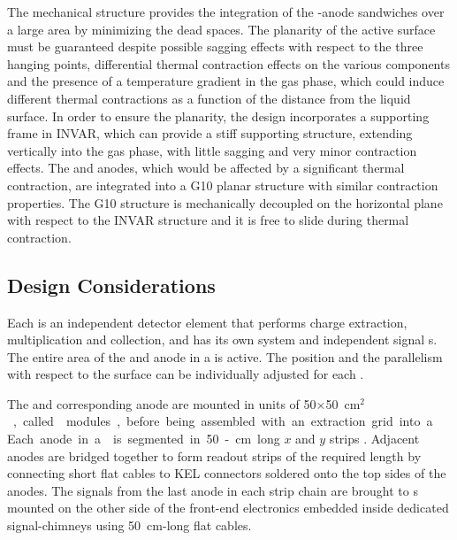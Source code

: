 The  mechanical structure provides the integration of the -anode sandwiches over a large area by minimizing the dead spaces. The planarity of the active surface must be guaranteed despite possible sagging effects with respect to the three hanging points, differential thermal contraction effects on the various  components and the presence of a temperature gradient in the gas phase, which could induce different thermal contractions as a function of the distance from the liquid surface. In order to %
ensure the planarity, the design %
incorporates a supporting frame in INVAR, which %
can provide a stiff supporting structure, extending vertically into the gas phase, with little sagging and %
very minor contraction effects. The  and anodes, which would be affected by a significant thermal contraction, are integrated into a G10 planar structure with similar contraction %
properties. The G10 structure is mechanically decoupled on the horizontal plane with respect to the INVAR structure  and it is free to slide during thermal contraction. 


\subsection{Design Considerations}
\label{sec:fddp-crp-des-consid}

Each  is an independent detector element that performs charge
extraction, multiplication and collection, and has its own  system and independent signal \fdth{}s. The entire area of the  and anode in a  is active. The position and the parallelism with respect to the \lar surface can be individually adjusted for each .

The  and corresponding anode are mounted in units of \num{50}$\times$\SI{50}{cm$^2$}, called %
 modules, before being assembled with an extraction grid into a . Each anode in a  is segmented in 50-cm long $x$ and $y$ strips . Adjacent  anodes are bridged together to form readout strips of the required length by connecting short flat cables to KEL connectors soldered onto the top sides of the anodes. The signals from the last anode in each  strip chain are brought to \fdth{}s mounted on the other side of the front-end electronics embedded inside dedicated signal-\fdth chimneys using \SI{50}{cm}-long flat cables.

